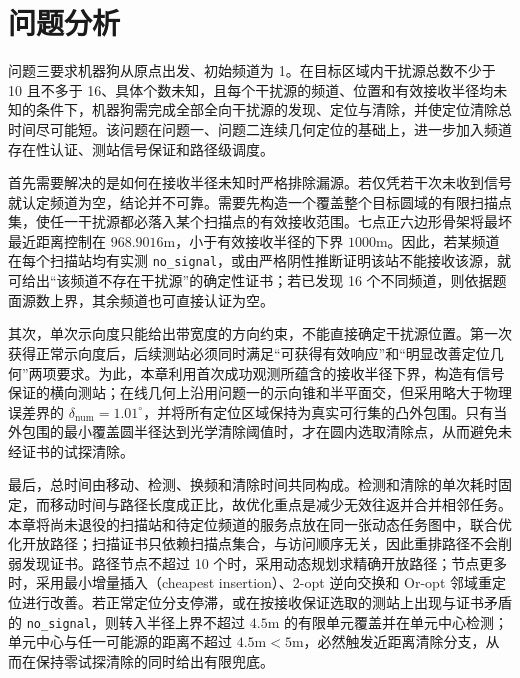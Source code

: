
\section{问题分析}

问题三要求机器狗从原点出发、初始频道为 1。在目标区域内干扰源总数不少于 10 且不多于 16、具体个数未知，且每个干扰源的频道、位置和有效接收半径均未知的条件下，机器狗需完成全部全向干扰源的发现、定位与清除，并使定位清除总时间尽可能短。该问题在问题一、问题二连续几何定位的基础上，进一步加入频道存在性认证、测站信号保证和路径级调度。

首先需要解决的是如何在接收半径未知时严格排除漏源。若仅凭若干次未收到信号就认定频道为空，结论并不可靠。需要先构造一个覆盖整个目标圆域的有限扫描点集，使任一干扰源都必落入某个扫描点的有效接收范围。七点正六边形骨架将最坏最近距离控制在 $968.9016\mathrm{m}$，小于有效接收半径的下界 $1000\mathrm{m}$。因此，若某频道在每个扫描站均有实测 \texttt{no\_signal}，或由严格阴性推断证明该站不能接收该源，就可给出“该频道不存在干扰源”的确定性证书；若已发现 16 个不同频道，则依据题面源数上界，其余频道也可直接认证为空。

其次，单次示向度只能给出带宽度的方向约束，不能直接确定干扰源位置。第一次获得正常示向度后，后续测站必须同时满足“可获得有效响应”和“明显改善定位几何”两项要求。为此，本章利用首次成功观测所蕴含的接收半径下界，构造有信号保证的横向测站；在线几何上沿用问题一的示向锥和半平面交，但采用略大于物理误差界的 $\delta_{\mathrm{num}}=1.01^\circ$，并将所有定位区域保持为真实可行集的凸外包围。只有当外包围的最小覆盖圆半径达到光学清除阈值时，才在圆内选取清除点，从而避免未经证书的试探清除。

最后，总时间由移动、检测、换频和清除时间共同构成。检测和清除的单次耗时固定，而移动时间与路径长度成正比，故优化重点是减少无效往返并合并相邻任务。本章将尚未退役的扫描站和待定位频道的服务点放在同一张动态任务图中，联合优化开放路径；扫描证书只依赖扫描点集合，与访问顺序无关，因此重排路径不会削弱发现证书。路径节点不超过 10 个时，采用动态规划求精确开放路径；节点更多时，采用最小增量插入（cheapest insertion）、2-opt 逆向交换和 Or-opt 邻域重定位进行改善。若正常定位分支停滞，或在按接收保证选取的测站上出现与证书矛盾的 \texttt{no\_signal}，则转入半径上界不超过 $4.5\mathrm{m}$ 的有限单元覆盖并在单元中心检测；单元中心与任一可能源的距离不超过 $4.5\mathrm{m}<5\mathrm{m}$，必然触发近距离清除分支，从而在保持零试探清除的同时给出有限兜底。

